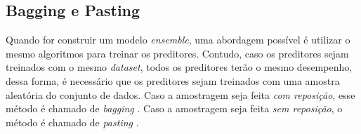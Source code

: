 \subsection{Bagging e Pasting}
\label{sec:bagging_pasting}
Quando for construir um modelo \textit{ensemble}, uma abordagem possível é utilizar o mesmo algoritmos para treinar os preditores. Contudo, caso os preditores sejam treinados com o mesmo \textit{dataset}, todos os preditores terão o mesmo desempenho, dessa forma, é necessário que os preditores sejam treinados com uma amostra aleatória do conjunto de dados. Caso a amostragem seja feita \textit{com reposição}, esse método é chamado de \textit{bagging} \cite{Breiman_Bagging:1996}. Caso a amostragem seja feita \textit{sem reposição}, o método é chamado de \textit{pasting} \cite{Breiman_Pasting:1999}. 